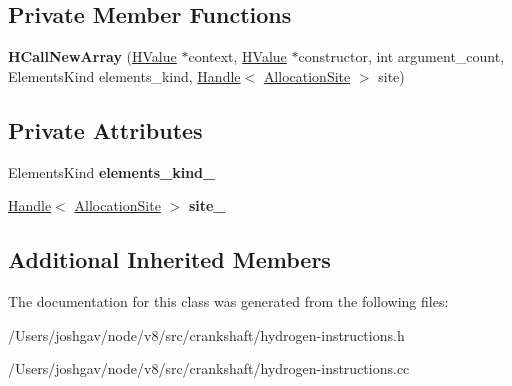 \subsection*{Private Member Functions}
\begin{DoxyCompactItemize}
\item 
{\bfseries H\+Call\+New\+Array} (\hyperlink{classv8_1_1internal_1_1_h_value}{H\+Value} $\ast$context, \hyperlink{classv8_1_1internal_1_1_h_value}{H\+Value} $\ast$constructor, int argument\+\_\+count, Elements\+Kind elements\+\_\+kind, \hyperlink{classv8_1_1internal_1_1_handle}{Handle}$<$ \hyperlink{classv8_1_1internal_1_1_allocation_site}{Allocation\+Site} $>$ site)\hypertarget{classv8_1_1internal_1_1_h_call_new_array_a4ccdf9d36cf3cacc9442b381fe0a92c5}{}\label{classv8_1_1internal_1_1_h_call_new_array_a4ccdf9d36cf3cacc9442b381fe0a92c5}

\end{DoxyCompactItemize}
\subsection*{Private Attributes}
\begin{DoxyCompactItemize}
\item 
Elements\+Kind {\bfseries elements\+\_\+kind\+\_\+}\hypertarget{classv8_1_1internal_1_1_h_call_new_array_abc762568e06ee4c8a66c4f1529600f1c}{}\label{classv8_1_1internal_1_1_h_call_new_array_abc762568e06ee4c8a66c4f1529600f1c}

\item 
\hyperlink{classv8_1_1internal_1_1_handle}{Handle}$<$ \hyperlink{classv8_1_1internal_1_1_allocation_site}{Allocation\+Site} $>$ {\bfseries site\+\_\+}\hypertarget{classv8_1_1internal_1_1_h_call_new_array_a149f8dc5348cd9320022852837389047}{}\label{classv8_1_1internal_1_1_h_call_new_array_a149f8dc5348cd9320022852837389047}

\end{DoxyCompactItemize}
\subsection*{Additional Inherited Members}


The documentation for this class was generated from the following files\+:\begin{DoxyCompactItemize}
\item 
/\+Users/joshgav/node/v8/src/crankshaft/hydrogen-\/instructions.\+h\item 
/\+Users/joshgav/node/v8/src/crankshaft/hydrogen-\/instructions.\+cc\end{DoxyCompactItemize}
